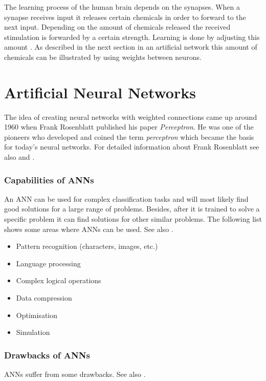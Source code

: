 The learning process of the human brain depends on the synapses. When a synapse receives input it releases certain chemicals in order to forward to the next input. Depending on the amount of chemicals released the received stimulation is forwarded by a certain strength. Learning is done by adjusting this amount \cite[p.157]{essence}. As described in the next section in an artificial network this amount of chemicals can be illustrated by using weights between neurons.

\section{Artificial Neural Networks}

The idea of creating neural networks with weighted connections came up around 1960 when Frank Rosenblatt published his paper {\em Perceptron}. He was one of the pioneers who developed and coined the term {\em perceptron} which became the basis for today's neural networks. For detailed information about Frank Rosenblatt see also \cite{rosenblatt} and \cite[p.55]{neuralnetworks}.

\subsubsection{Capabilities of ANNs}

An ANN can be used for complex classification tasks and will most likely find good solutions for a large range of problems. Besides, after it is trained to solve a specific problem it can find solutions for other similar problems. The following list shows some areas where ANNs can be used. See also \cite{nn_applications}.

\begin{itemize}
    \item Pattern recognition (characters, images, etc.)
	\item Language processing
	\item Complex logical operations
	\item Data compression
	\item Optimisation
	\item Simulation
\end{itemize}

\subsubsection{Drawbacks of ANNs}

ANNs suffer from some drawbacks. See also \cite{nn_limitations}.

